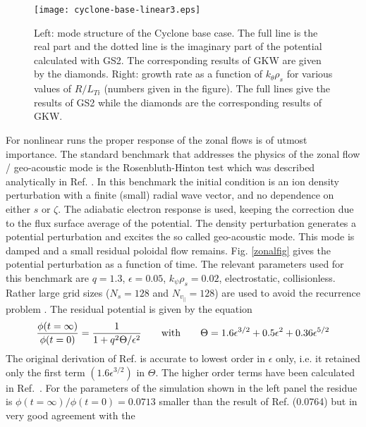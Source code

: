 \begin{figure}[htb] 
\begin{center}
\texttt{[image: cyclone-base-linear3.eps]}
\caption{Left: mode structure of the Cyclone base case. The full line is the 
real part and the dotted line is the imaginary part of the potential calculated with GS2. 
The corresponding results of GKW are given by the diamonds. Right: growth rate as a function 
of $k_\theta \rho_s$ for various values of $R/L_{Ti}$ (numbers given in the figure). The full 
lines give the results of GS2 while the diamonds are the corresponding results of GKW.} 
\label{fig:cyclone-linear}
\end{center}
\end{figure}  

For nonlinear runs the proper response of the zonal flows is of utmost importance. 
The standard benchmark \cite{CAN03,JEN05,JOL07} that addresses the physics of the zonal flow / geo-acoustic 
mode is the Rosenbluth-Hinton test which was described analytically in Ref. \cite{HINROS}. 
In this benchmark the initial condition is an ion density 
perturbation with a finite (small) radial wave vector, and no dependence on either $s$ or $\zeta$.  
The adiabatic electron response is used, keeping the correction due to the flux surface average 
of the potential. The density perturbation generates a potential perturbation and excites the so
called geo-acoustic mode. This mode is damped and a small residual poloidal flow remains. Fig. 
\ref{zonalfig} gives the potential perturbation as a function of time. The relevant parameters used for this 
benchmark are $q = 1.3$, $\epsilon = 0.05$, $k_\psi \rho_s = 0.02$, electrostatic, collisionless. 
Rather large grid sizes ($N_s = 128$ and $N_{v_\parallel} = 128$) are used to avoid the recurrence 
problem \cite{CAN03}. The residual potential is given by the equation 
\begin{equation} 
{ \phi (t= \infty) \over \phi (t= 0) } = {1 \over 1 + q^2 \Theta / \epsilon^2} \qquad 
{\rm with} \qquad \Theta = 1.6 \epsilon^{3/2} + 0.5 \epsilon^2 + 0.36 \epsilon^{5/2} 
\end{equation}
The original derivation of Ref. \cite{HINROS} is accurate to lowest order in $\epsilon$ only, i.e. 
it retained only the first term $(1.6 \epsilon^{3/2})$ in $\Theta$. 
The higher order terms have been calculated in Ref.~\cite{XIA06}. 
For the parameters of the simulation shown in the left panel the residue is $\phi(t = \infty) / \phi(t= 0) 
= 0.0713$ smaller than the result of Ref. \cite{HINROS} (0.0764) but in very good agreement with the 
